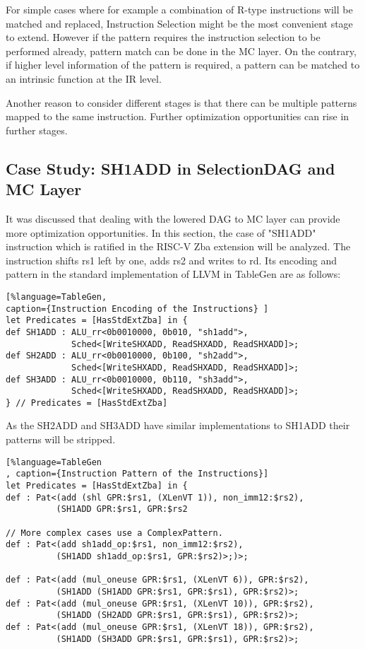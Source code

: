 For simple cases where for example a combination of R-type instructions will be matched and replaced, Instruction Selection might be the most convenient stage to extend. However if the pattern requires the instruction selection to be performed already, pattern match can be done in the MC layer. On the contrary, if higher level information of the pattern is required, a pattern can be matched to an intrinsic function at the IR level. 

Another reason to consider different stages is that there can be multiple patterns mapped to the same instruction. Further optimization opportunities can rise in further stages. 

\subsection{Case Study: SH1ADD in SelectionDAG and MC Layer}

It was discussed that dealing with the lowered DAG to MC layer can provide more optimization opportunities. In this section, the case of "SH1ADD" instruction which is ratified in the RISC-V Zba extension will be analyzed. The instruction shifts rs1 left by one, adds rs2 and writes to rd. Its encoding and pattern in the standard implementation of LLVM in TableGen are as follows:

\begin{lstlisting}[%language=TableGen,
caption={Instruction Encoding of the Instructions} ]
let Predicates = [HasStdExtZba] in {
def SH1ADD : ALU_rr<0b0010000, 0b010, "sh1add">,
             Sched<[WriteSHXADD, ReadSHXADD, ReadSHXADD]>;
def SH2ADD : ALU_rr<0b0010000, 0b100, "sh2add">,
             Sched<[WriteSHXADD, ReadSHXADD, ReadSHXADD]>;
def SH3ADD : ALU_rr<0b0010000, 0b110, "sh3add">,
             Sched<[WriteSHXADD, ReadSHXADD, ReadSHXADD]>;
} // Predicates = [HasStdExtZba]
\end{lstlisting}

As the SH2ADD and SH3ADD have similar implementations to SH1ADD their patterns will be stripped.

\begin{lstlisting}[%language=TableGen
, caption={Instruction Pattern of the Instructions}]
let Predicates = [HasStdExtZba] in {
def : Pat<(add (shl GPR:$rs1, (XLenVT 1)), non_imm12:$rs2),
          (SH1ADD GPR:$rs1, GPR:$rs2

// More complex cases use a ComplexPattern.
def : Pat<(add sh1add_op:$rs1, non_imm12:$rs2),
          (SH1ADD sh1add_op:$rs1, GPR:$rs2)>;)>;

def : Pat<(add (mul_oneuse GPR:$rs1, (XLenVT 6)), GPR:$rs2),
          (SH1ADD (SH1ADD GPR:$rs1, GPR:$rs1), GPR:$rs2)>;
def : Pat<(add (mul_oneuse GPR:$rs1, (XLenVT 10)), GPR:$rs2),
          (SH1ADD (SH2ADD GPR:$rs1, GPR:$rs1), GPR:$rs2)>;
def : Pat<(add (mul_oneuse GPR:$rs1, (XLenVT 18)), GPR:$rs2),
          (SH1ADD (SH3ADD GPR:$rs1, GPR:$rs1), GPR:$rs2)>;
\end{lstlisting}

